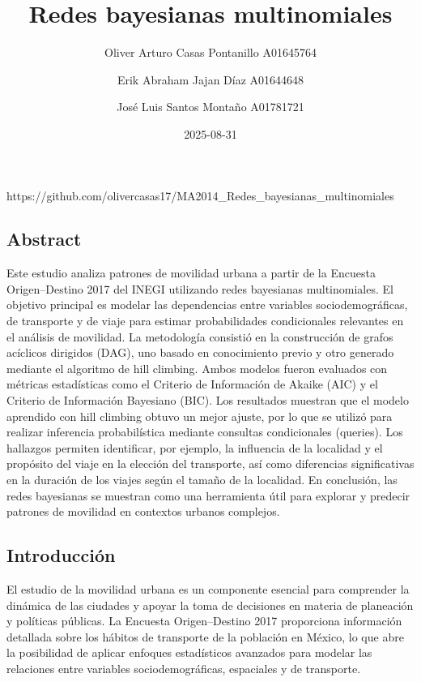 \documentclass[
  11pt,
  a4paper,
]{article}
\title{Redes bayesianas multinomiales}
\author{Oliver Arturo Casas Pontanillo \textbar{} A01645764 \and Erik
Abraham Jajan Díaz \textbar{} A01644648 \and José Luis Santos Montaño
\textbar{} A01781721}
\date{2025-08-31}
\renewcommand*\contentsname{Table of contents}
\newcommand\contentsname{Table of contents}
\begin{document}
\maketitle

\renewcommand*\contentsname{Table of contents}
{
\hypersetup{linkcolor=}
\setcounter{tocdepth}{3}
\tableofcontents
}

https://github.com/olivercasas17/MA2014\_Redes\_bayesianas\_multinomiales

\subsection{Abstract}\label{abstract}

Este estudio analiza patrones de movilidad urbana a partir de la
Encuesta Origen--Destino 2017 del INEGI utilizando redes bayesianas
multinomiales. El objetivo principal es modelar las dependencias entre
variables sociodemográficas, de transporte y de viaje para estimar
probabilidades condicionales relevantes en el análisis de movilidad. La
metodología consistió en la construcción de grafos acíclicos dirigidos
(DAG), uno basado en conocimiento previo y otro generado mediante el
algoritmo de hill climbing. Ambos modelos fueron evaluados con métricas
estadísticas como el Criterio de Información de Akaike (AIC) y el
Criterio de Información Bayesiano (BIC). Los resultados muestran que el
modelo aprendido con hill climbing obtuvo un mejor ajuste, por lo que se
utilizó para realizar inferencia probabilística mediante consultas
condicionales (queries). Los hallazgos permiten identificar, por
ejemplo, la influencia de la localidad y el propósito del viaje en la
elección del transporte, así como diferencias significativas en la
duración de los viajes según el tamaño de la localidad. En conclusión,
las redes bayesianas se muestran como una herramienta útil para explorar
y predecir patrones de movilidad en contextos urbanos complejos.

\subsection{Introducción}\label{introducciuxf3n}

El estudio de la movilidad urbana es un componente esencial para
comprender la dinámica de las ciudades y apoyar la toma de decisiones en
materia de planeación y políticas públicas. La Encuesta Origen--Destino
2017 proporciona información detallada sobre los hábitos de transporte
de la población en México, lo que abre la posibilidad de aplicar
enfoques estadísticos avanzados para modelar las relaciones entre
variables sociodemográficas, espaciales y de transporte.
\end{document}
